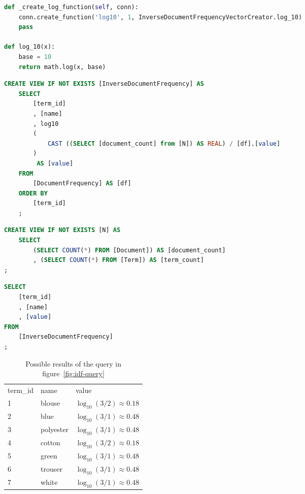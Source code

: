 \begin{lstlisting}[language=Python,caption={SQL-statement to create the InverseDocumentFrequency-view},label={lst:idf-view}]
def _create_log_function(self, conn):
    conn.create_function('log10', 1, InverseDocumentFrequencyVectorCreator.log_10)
    pass

def log_10(x):
    base = 10
    return math.log(x, base)
\end{lstlisting}
\begin{lstlisting}[language=SQL]
CREATE VIEW IF NOT EXISTS [InverseDocumentFrequency] AS
    SELECT
        [term_id]
        , [name]
        , log10
        (
            CAST ((SELECT [document_count] from [N]) AS REAL) / [df].[value]
        )
         AS [value]
    FROM
        [DocumentFrequency] AS [df]
    ORDER BY
        [term_id]
    ;
\end{lstlisting}


\begin{lstlisting}[language=SQL,caption={SQL-statement to create the N-view},label={lst:n-view},float=h]
CREATE VIEW IF NOT EXISTS [N] AS
    SELECT
        (SELECT COUNT(*) FROM [Document]) AS [document_count]
        , (SELECT COUNT(*) FROM [Term]) AS [term_count]
;
\end{lstlisting}


\begin{lstlisting}[language=SQL,caption={SQL-query for generating idf-vectors},label={fig:idf-query},float=h]
SELECT
    [term_id]
    , [name]
    , [value]
FROM
    [InverseDocumentFrequency]
;
\end{lstlisting}


\begin{table}
    \center
    \begin{tabular}{ l | l | l }
        \rowcolor{\dustRowHead}
        \multicolumn{3}{ c }{\textbf{idf}}\\\hline
        term\_id    & name      & value\\\hline
        1           & blouse    & $\log_{10}(3/2) \approx 0.18$\\
        2           & blue      & $\log_{10}(3/1) \approx 0.48$\\
        3           & polyester & $\log_{10}(3/1) \approx 0.48$\\
        4           & cotton    & $\log_{10}(3/2) \approx 0.18$\\
        5           & green     & $\log_{10}(3/1) \approx 0.48$\\
        6           & trouser   & $\log_{10}(3/1) \approx 0.48$\\
        7           & white     & $\log_{10}(3/1) \approx 0.48$\\
    \end{tabular}
    \caption{Possible results of the query in figure~\ref{fig:idf-query}}
    \label{tab:idf-query-result}
\end{table}

